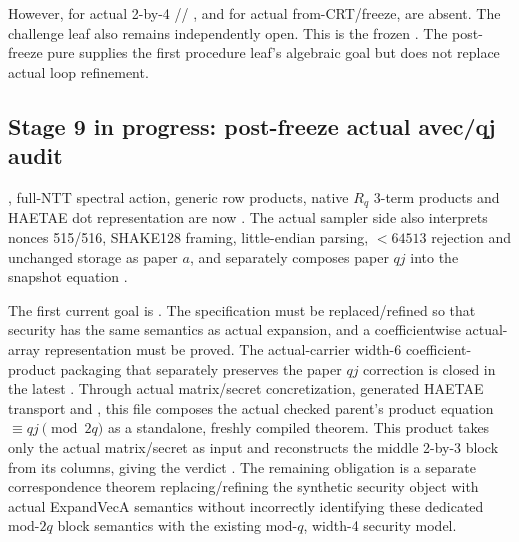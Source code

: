 However,  for actual 2-by-4
//
, and
 for actual from-CRT/freeze,
are absent. The challenge leaf
 also remains
independently open. This is the frozen \FrozenPaperGate. The post-freeze pure
 supplies the first procedure
leaf's algebraic goal but does not replace actual loop refinement.

\subsection{Stage 9 in progress: post-freeze actual avec/qj audit}

, full-NTT spectral action, generic row
products, native \(R_q\) 3-term products and HAETAE dot representation are
now \statusproved. The actual sampler side also interprets nonces 515/516,
SHAKE128 framing, little-endian parsing, \(<64513\) rejection and unchanged
storage as paper \(a\), and separately composes paper \(qj\) into the snapshot
equation \cite{post-freeze-kg-rq-haetae-report,
post-freeze-kg-actual-avec-qj-report}.

The first current goal is .
The specification must be replaced/refined so that security
 has the same semantics as actual
expansion, and a coefficientwise actual-array representation must be proved.
The actual-carrier width-6 coefficient-product packaging that separately preserves
the paper \(qj\) correction is closed in the latest
. Through actual matrix/secret
concretization, generated HAETAE  transport and
, this file composes the actual
checked parent's product equation \(\equiv qj\pmod{2q}\) as a standalone,
freshly compiled theorem. This product takes only the actual matrix/secret as
input and reconstructs the middle 2-by-3 block from its columns, giving the
verdict \FaithfulAugmentedVerdict. The remaining obligation is a separate
correspondence theorem replacing/refining the synthetic security object with
actual ExpandVecA semantics without incorrectly identifying these dedicated
mod-\(2q\) block semantics with the existing mod-\(q\), width-4 security model.

